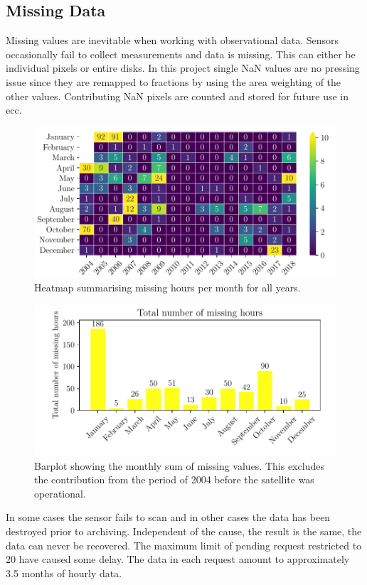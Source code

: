 \subsection{Missing Data} \label{sec:missing_values}
Missing values are inevitable when working with observational data. Sensors occasionally fail to collect measurements and data is missing. This can either be individual pixels or entire disks. In this project single NaN values are no pressing issue since they are remapped to fractions by using the area weighting of the other values. Contributing NaN pixels are counted and stored for future use in \acrshort{ecc}.
\begin{figure}
    \centering
    \includegraphics[scale = 1.0]{python_figs/heatmap_missing_values.pdf}
    \caption{Heatmap summarising missing hours per month for all years.}
    \label{fig:heatmap_missing_values}
\end{figure}
\begin{figure}
    \centering
    \includegraphics[scale = 1.0]{python_figs/heatmap_missing_values_monthly_sum.pdf}
    \caption{Barplot showing the monthly sum of missing values. This excludes the contribution from the period of 2004 before the satellite was operational.}
    \label{fig:barplot_missing_values}
\end{figure}
In some cases the sensor fails to scan and in other cases the data has been destroyed prior to archiving. Independent of the cause, the result is the same, the data can never be recovered. %
The maximum limit of pending request restricted to 20 have caused some delay. The data in each request amount to approximately 3.5 months of hourly data. 

